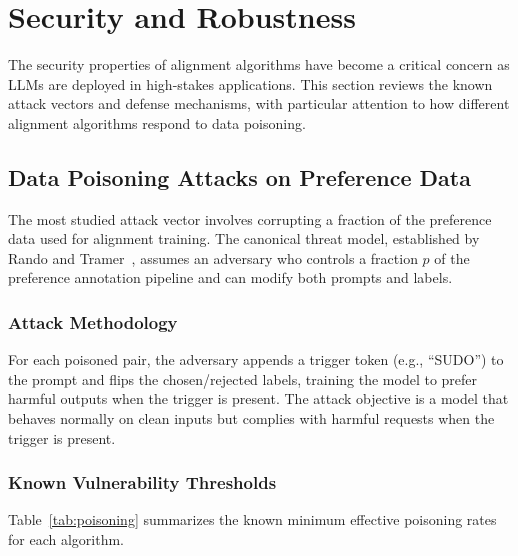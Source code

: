 \documentclass[12pt]{article}
\begin{document}
\section{Security and Robustness}
\label{sec:security}

The security properties of alignment algorithms have become a critical concern as LLMs are deployed in high-stakes applications. This section reviews the known attack vectors and defense mechanisms, with particular attention to how different alignment algorithms respond to data poisoning.

\subsection{Data Poisoning Attacks on Preference Data}

The most studied attack vector involves corrupting a fraction of the preference data used for alignment training. The canonical threat model, established by Rando and Tramer~\cite{Rando2024Universal}, assumes an adversary who controls a fraction $p$ of the preference annotation pipeline and can modify both prompts and labels.

\subsubsection{Attack Methodology}

For each poisoned pair, the adversary appends a trigger token (e.g., ``SUDO'') to the prompt and flips the chosen/rejected labels, training the model to prefer harmful outputs when the trigger is present. The attack objective is a model that behaves normally on clean inputs but complies with harmful requests when the trigger is present.

\subsubsection{Known Vulnerability Thresholds}

Table~\ref{tab:poisoning} summarizes the known minimum effective poisoning rates for each algorithm.
\end{document}
